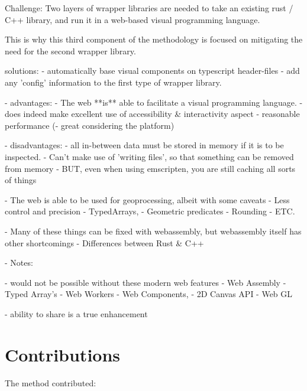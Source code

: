 Challenge:
Two layers of wrapper libraries are needed to take an existing rust / C++ library, and run it in a web-based visual programming language.

This is why this third component of the methodology is focused on mitigating the need for the second wrapper library. 

solutions: 
- automatically base visual components on typescript header-files
- add any 'config' information to the first type of wrapper library. 


- advantages: 
  - The web **is** able to facilitate a visual programming language.
    - does indeed make excellent use of accessibility \& interactivity aspect
  - reasonable performance 
    (- great considering the platform)

- disadvantages: 
  - all in-between data must be stored in memory if it is to be inspected.
    - Can't make use of 'writing files', so that something can be removed from memory 
    - BUT, even when using emscripten, you are still caching all sorts of things

  - The web is able to be used for geoprocessing, albeit with some caveats
    - Less control and precision
    - TypedArrays,
    - Geometric predicates 
    - Rounding
    - ETC.

  - Many of these things can be fixed with webassembly, but webassembly itself has other shortcomings
    - Differences between Rust \& C++

 - Notes:

   - would not be possible without these modern web features
    - Web Assembly 
    - Typed Array's 
    - Web Workers
    - Web Components,
    - 2D Canvas API
    - Web GL

- ability to share is a true enhancement







\section{Contributions}
\label{sec:contribution}

The method contributed:


